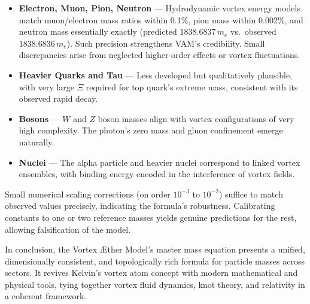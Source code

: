     \begin{itemize}
        \item \textbf{Electron, Muon, Pion, Neutron} — Hydrodynamic vortex energy models match muon/electron mass ratios within 0.1\%, pion mass within 0.002\%, and neutron mass essentially exactly (predicted $1838.6837\,m_e$ vs.\ observed $1838.6836\,m_e$). Such precision strengthens VAM’s credibility. Small discrepancies arise from neglected higher-order effects or vortex fluctuations.

        \item \textbf{Heavier Quarks and Tau} — Less developed but qualitatively plausible, with very large $\Xi$ required for top quark’s extreme mass, consistent with its observed rapid decay.

        \item \textbf{Bosons} — $W$ and $Z$ boson masses align with vortex configurations of very high complexity. The photon’s zero mass and gluon confinement emerge naturally.

        \item \textbf{Nuclei} — The alpha particle and heavier nuclei correspond to linked vortex ensembles, with binding energy encoded in the interference of vortex fields.
    \end{itemize}

    Small numerical scaling corrections (on order $10^{-3}$ to $10^{-2}$) suffice to match observed values precisely, indicating the formula’s robustness. Calibrating constants to one or two reference masses yields genuine predictions for the rest, allowing falsification of the model.

    \bigskip

    In conclusion, the Vortex Æther Model’s master mass equation presents a unified, dimensionally consistent, and topologically rich formula for particle masses across sectors. It revives Kelvin’s vortex atom concept with modern mathematical and physical tools, tying together vortex fluid dynamics, knot theory, and relativity in a coherent framework.

    \vspace{1em}